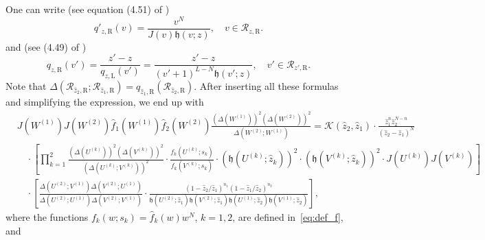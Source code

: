 \documentclass{article}
\numberwithin{equation}{section}
\newcommand{\LL}{\mathrm{L}}
\newcommand{\RR}{\mathrm{R}}
\begin{document}
One can write (see equation (4.51) of \cite{Baik-Liu17})
\begin{equation*}
	q'_{z,\RR}(v) = \frac{v^N}{J(v)\mathfrak{h}(v;z)},\quad v\in\mathcal{R}_{z,\RR}.
\end{equation*}
and (see (4.49) of \cite{Baik-Liu17})
\begin{equation*}
	q_{z,\RR}(v') = \frac{z'-z}{q_{z,\LL}(v')} =\frac{z'-z}{(v'+1)^{L-N}\mathfrak{h}(v';z)},\quad v'\in\mathcal{R}_{z',\RR}.
\end{equation*}
Note that $\Delta\left(\mathcal{R}_{\hat z_2,\RR};\mathcal{R}_{\hat z_1,\RR}\right) = q_{\hat z_1,\RR}\left(\mathcal{R}_{\hat z_2,\RR}\right)$. After inserting all these formulas and simplifying the expression, we end up with
\begin{equation}
	\label{eq:aux_05}
	\begin{split}
&	J\left(W^{(1)}\right)J\left(W^{(2)}\right)
	\hat f_1\left(W^{(1)}\right)
	\hat f_2\left(W^{(2)}\right)
	\frac{ \left( \Delta\left(W^{(1)}\right) \right)^2 
		\left( \Delta\left(W^{(2)}\right) \right)^2
	}
	{ \Delta\left(W^{(2)};W^{(1)}\right)
	}=\mathcal{K}(\hat z_2,\hat z_1)\cdot \frac{\hat z_1^n \hat z_2^{N-n}}{(\hat z_2-\hat z_1)^N}\\
&\quad\cdot \left[  
       \prod_{k=1}^2
            \frac{(\Delta(U^{(k)}))^2(\Delta(V^{(k)}))^2}
                 {(\Delta(U^{(k)};V^{(k)}))^2}
            \cdot
            \frac{f_k(U^{(k)};s_k)}{f_k(V^{(k)};s_k)}
            \cdot
              \left( \mathfrak{h}(U^{(k)};\hat z_k)
              \right)^2
            \cdot
              \left( \mathfrak{h}(V^{(k)};\hat z_k)
              \right)^2
            \cdot 
              J(U^{(k)}) J(V^{(k)})
\right]\\
&\quad \cdot
       \left[
           \frac{
           	     \Delta(U^{(2)};V^{(1)}) \Delta (V^{(2)}; U^{(1)})
                }                 
                {
                 \Delta(U^{(2)};U^{(1)}) \Delta (V^{(2)}; V^{(1)})
                }
            \cdot
            \frac{
            	  (1-\hat z_{2}/\hat z_1)^{n_1}
            	  (1-\hat z_{1}/\hat z_2)^{n_2}
                 }
                 {
                  \mathfrak{h}(U^{(2)};\hat z_1)
                  \mathfrak{h}(V^{(2)};\hat z_1)	
                  \mathfrak{h}(U^{(1)};\hat z_2)
                  \mathfrak{h}(V^{(1)};\hat z_2)
                 }
       \right],
\end{split}
\end{equation}
where the functions $f_k(w;s_k)=\hat f_k(w) w^N$, $k=1,2$, are defined in~\eqref{eq:def_f}, and
\end{document}
